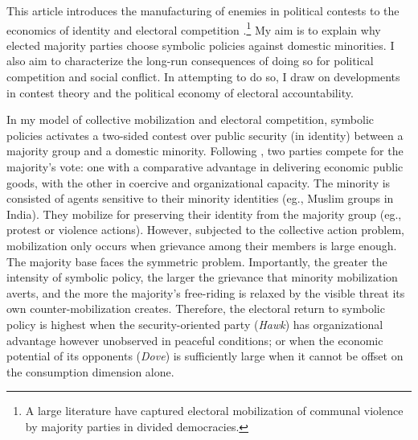 \documentclass[11pt,twoside]{extarticle}
\begin{document}

This article introduces the manufacturing of enemies in political contests to the economics of identity and electoral competition \citep*{shayoModelSocialIdentity2009,glaeserPoliticalEconomyHatred2005,gennaioliIdentityPolitics2023}.\footnote{A large literature have captured electoral mobilization of communal violence by majority parties in divided democracies.} My aim is to explain why elected majority parties choose symbolic policies against domestic minorities. I also aim to characterize the long-run consequences of doing so for political competition and social conflict. In attempting to do so, I draw on developments in contest theory and the political economy of electoral accountability.


In my model of collective mobilization and electoral competition, symbolic policies activates a two-sided contest over public security (in identity) between a majority group and a domestic minority. Following \citet*{baligaStrategyManipulatingConflict2012}, two parties compete for the majority's vote: one with a comparative advantage in delivering economic public goods, with the other in coercive and organizational capacity. The minority is consisted of agents sensitive to their minority identities (eg., Muslim groups in India). They mobilize for preserving their identity from the majority group (eg., protest or violence actions). However, subjected to the collective action problem, mobilization only occurs when grievance among their members is large enough. The majority base faces the symmetric problem. Importantly, the greater the intensity of symbolic policy, the larger the grievance that minority mobilization averts, and the more the majority's free-riding is relaxed by the visible threat its own counter-mobilization creates. Therefore, the electoral return to symbolic policy is highest when the security-oriented party (\emph{Hawk}) has organizational advantage however unobserved in peaceful conditions; or when the economic potential of its opponents (\emph{Dove}) is sufficiently large when it cannot be offset on the consumption dimension alone.

\end{document}
